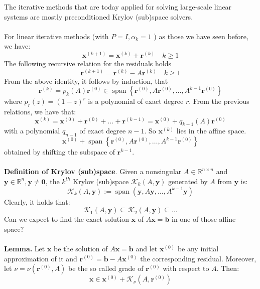 \documentclass[11pt]{book}
\begin{document}
The iterative methods that are today applied for solving large-scale linear systems are mostly preconditioned Krylov (sub)space solvers.\\ \\
For linear iterative methods (with $P=I, \alpha_{k}=1$ ) as those we have seen before, we have:
$$
\mathbf{x}^{(k+1)}=\mathbf{x}^{(k)}+\mathbf{r}^{(k)} \quad k \geq 1
$$
The following recursive relation for the residuals holds
$$
\mathbf{r}^{(k+1)}=\mathbf{r}^{(k)}-A \mathbf{r}^{(k)} \quad k \geq 1
$$
From the above identity, it follows by induction, that
$$
\mathbf{r}^{(k)}=p_{k}(A) \mathbf{r}^{(0)} \in \operatorname{span}\left\{\mathbf{r}^{(0)}, A \mathbf{r}^{(0)}, \ldots, A^{k-1} \mathbf{r}^{(0)}\right\}
$$
where $p_{r}(z)=(1-z)^{r}$ is a polynomial of exact degree $r$.
From the previous relations, we have that:
$$
\mathbf{x}^{(k)}=\mathbf{x}^{(0)}+\mathbf{r}^{(0)}+\ldots+\mathbf{r}^{(k-1)}=\mathbf{x}^{(0)}+q_{k-1}(A) \mathbf{r}^{(0)}
$$
with a polynomial $q_{n-1}$ of exact degree $n-1$.
So $\mathbf{x}^{(k)}$ lies in the affine space.
$$
\mathbf{x}^{(0)}+\operatorname{span}\left\{\mathbf{r}^{(0)}, A \mathbf{r}^{(0)}, \ldots, A^{k-1} \mathbf{r}^{(0)}\right\}
$$
obtained by shifting the subspace of $\mathbf{r}^{k-1}$.\\ \\ 
\textbf{Definition of Krylov (sub)space}. Given a nonsingular $A \in \mathbb{R}^{n \times n}$ and $\mathbf{y} \in \mathbb{R}^{n}, \mathbf{y} \neq \mathbf{0}$, the $k^{th}$ Krylov (sub)space $\mathscr{K}_{k}(A, \mathbf{y})$ generated by $A$ from $\mathbf{y}$ is:
$$
\mathscr{K}_{k}(A, \mathbf{y}):=\operatorname{span}\left(\mathbf{y}, A \mathbf{y}, \ldots, A^{k-1} \mathbf{y}\right)
$$
Clearly, it holds that:
$$\mathscr{K}_{1}(A, \mathbf{y}) \subseteq \mathscr{K}_{2}(A, \mathbf{y}) \subseteq \ldots$$
Can we expect to find the exact solution $\mathbf{x}$ of $A \mathbf{x}=\mathbf{b}$ in one of those affine space?\\ \\
\textbf{Lemma.} Let $\mathbf{x}$ be the solution of $A \mathbf{x}=\mathbf{b}$ and let $\mathbf{x}^{(0)}$ be any initial approximation of it and $\mathbf{r}^{(0)}=\mathbf{b}-A \mathbf{x}^{(0)}$ the corresponding residual. Moreover, let $\nu=\nu\left(\mathbf{r}^{(0)}, A\right)$ be the so called grade of $\mathbf{r}^{(0)}$ with respect to $A$. Then:
$$
\mathbf{x} \in \mathbf{x}^{(0)}+\mathscr{K}_{\nu}\left(A, \mathbf{r}^{(0)}\right)
$$
\end{document}
